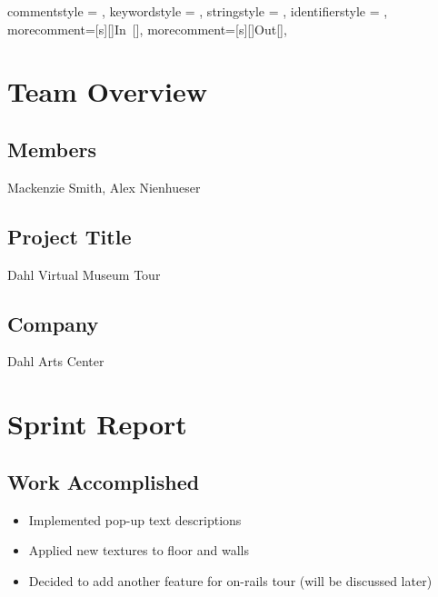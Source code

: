 



 {
commentstyle = \color{black},
keywordstyle = \color{black},
stringstyle = \color{black},
identifierstyle = \color{black},
morecomment=[s][\color{blue}]{In\ [}{]\:},
morecomment=[s][\color{red}]{Out[}{]\:},
 }

\pagestyle{empty}

\renewcommand{\familydefault}{\sfdefault}



\section*{Team Overview}
\hrulefill
\subsection*{Members}
Mackenzie Smith, Alex Nienhueser

\subsection*{Project Title}
Dahl Virtual Museum Tour

\subsection*{Company}
Dahl Arts Center


\section*{Sprint Report}
\hrulefill
\subsection*{Work Accomplished}
\begin{itemize}
\item Implemented pop-up text descriptions
\item Applied new textures to floor and walls
\item Decided to add another feature for on-rails tour (will be discussed later)


\end{itemize}
